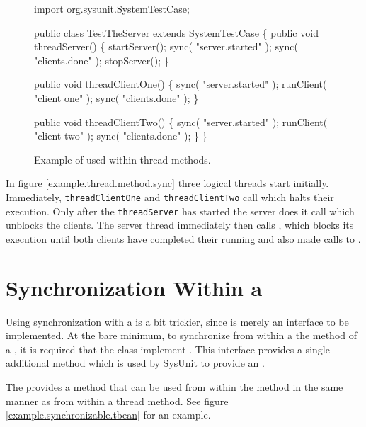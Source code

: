 \begin{figure}
\begin{codelisting}
import org.sysunit.SystemTestCase;

public class TestTheServer
    extends SystemTestCase
\{
    public void threadServer() 
    \{
        startServer();
        sync( "server.started" );
        sync( "clients.done" );
        stopServer();
    \}

    public void threadClientOne()
    \{
        sync( "server.started" );
        runClient( "client one" );
        sync( "clients.done" );
    \}

    public void threadClientTwo()
    \{
        sync( "server.started" );
        runClient( "client two" );
        sync( "clients.done" );
    \}
\}
\end{codelisting}
\caption{Example of  used
within thread methods.}
\label{example.thread.method.sync}
\end{figure}

In figure \vref{example.thread.method.sync} three logical threads
start initially.  Immediately, \texttt{threadClientOne} and
\texttt{threadClientTwo} call 
which halts their execution.  Only after the \texttt{threadServer}
has started the server does it call 
which unblocks the clients.  The server thread immediately then
calls , which blocks its execution
until both clients have completed their running and also made
calls to .

\section{Synchronization Within a }

Using synchronization with a  is a bit trickier,
since  is merely an interface to be implemented.  At
the bare minimum, to synchronize from within a the
 method of a , it is required
that the class implement .  This
interface provides a single additional method
 which is
used by SysUnit to provide an .

The  provides a
 method that can be
used from within the  method in the same manner
as from within a thread method.  See figure
\vref{example.synchronizable.tbean} for an example.


